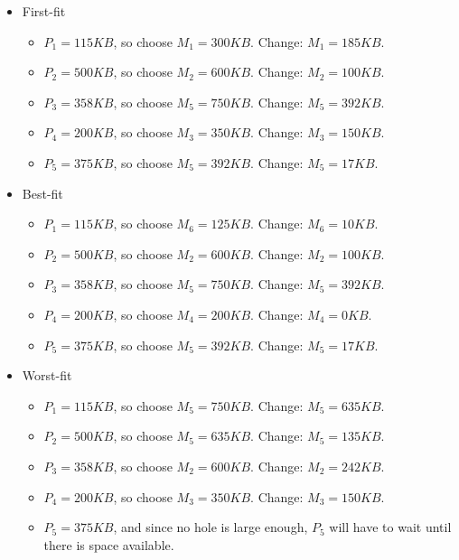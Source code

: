 \documentclass[12pt]{article}
\begin{document}
\begin{itemize}
\item First-fit
\begin{itemize}
\item $P_{1} = 115KB$, so choose $M_{1} = 300KB$. Change: $M_{1} = 185KB$.
\item $P_{2} = 500KB$, so choose $M_{2} = 600KB$. Change: $M_{2} = 100KB$.
\item $P_{3} = 358KB$, so choose $M_{5} = 750KB$. Change: $M_{5} = 392KB$.
\item $P_{4} = 200KB$, so choose $M_{3} = 350KB$. Change: $M_{3} = 150KB$.
\item $P_{5} = 375KB$, so choose $M_{5} = 392KB$. Change: $M_{5} = 17KB$.
\end{itemize}
\item Best-fit
\begin{itemize}
\item $P_{1} = 115KB$, so choose $M_{6} = 125KB$. Change: $M_{6} = 10KB$.
\item $P_{2} = 500KB$, so choose $M_{2} = 600KB$. Change: $M_{2} = 100KB$.
\item $P_{3} = 358KB$, so choose $M_{5} = 750KB$. Change: $M_{5} = 392KB$.
\item $P_{4} = 200KB$, so choose $M_{4} = 200KB$. Change: $M_{4} = 0KB$.
\item $P_{5} = 375KB$, so choose $M_{5} = 392KB$. Change: $M_{5} = 17KB$.
\end{itemize}
\item Worst-fit
\begin{itemize}
\item $P_{1} = 115KB$, so choose $M_{5} = 750KB$. Change: $M_{5} = 635KB$.
\item $P_{2} = 500KB$, so choose $M_{5} = 635KB$. Change: $M_{5} = 135KB$.
\item $P_{3} = 358KB$, so choose $M_{2} = 600KB$. Change: $M_{2} = 242KB$.
\item $P_{4} = 200KB$, so choose $M_{3} = 350KB$. Change: $M_{3} = 150KB$.
\item $P_{5} = 375KB$, and since no hole is large enough, $P_{5}$ will have to wait until there is space available.
\end{itemize}
\end{itemize}
\end{document}
